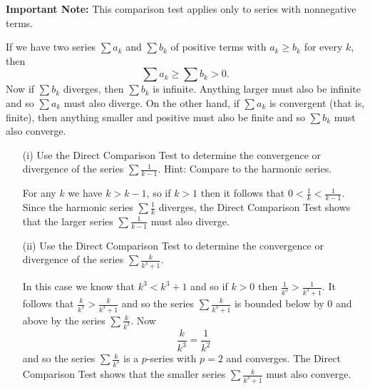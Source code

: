 \begin{exercises}
\noindent \textbf{Important Note:} This comparison test applies only to series with nonnegative terms.

\begin{exerciseSolution}
If we have two series $\sum a_k$ and $\sum b_k$ of positive terms with $a_k \geq b_k$ for every $k$, then
\[\sum a_k \geq \sum b_k > 0.\]
Now if $\sum b_k$ diverges, then $\sum b_k$ is infinite. Anything larger must also be infinite and so $\sum a_k$ must also diverge. On the other hand, if $\sum a_k$ is convergent (that is, finite), then anything smaller and positive must also be finite and so $\sum b_k$ must also converge. \end{exerciseSolution}

    \begin{itemize}
    \item[(i)] Use the Direct Comparison Test to determine the convergence or divergence of the series $ \sum \frac{1}{k-1}$. Hint: Compare to the harmonic series.

\begin{exerciseSolution}
For any $k$ we have $k > k-1$, so if $k > 1$ then it follows that $0 < \frac{1}{k} < \frac{1}{k-1}$. Since the harmonic series $ \sum \frac{1}{k}$ diverges, the Direct Comparison Test shows that the larger series $ \sum \frac{1}{k-1}$ must also diverge.
\end{exerciseSolution}

    \item[(ii)] Use the Direct Comparison Test to determine the convergence or divergence of the series $ \sum \frac{k}{k^3+1}$.

\begin{exerciseSolution}
In this case we know that $k^3 < k^3+1$ and so if $k > 0$ then $\frac{1}{k^3} > \frac{1}{k^3+1}$. It follows that $\frac{k}{k^3} > \frac{k}{k^3+1}$ and so the series $ \sum \frac{k}{k^3+1}$ is bounded below by 0 and above by the series $ \sum \frac{k}{k^3}$. Now
\[\frac{k}{k^3} = \frac{1}{k^2}\]
and so the series $ \sum \frac{k}{k^3}$ is a $p$-series with $p=2$ and converges. The Direct Comparison Test shows that the smaller series $ \sum \frac{k}{k^3+1}$ must also converge.
\end{exerciseSolution}

    \end{itemize}

    \ea



\end{exercises}


\afterexercises
